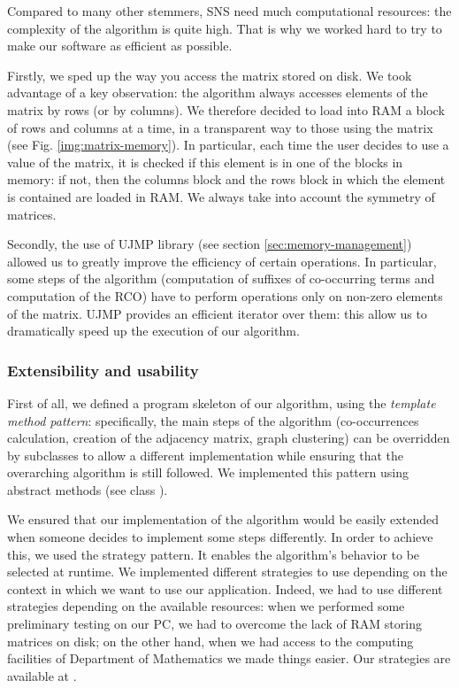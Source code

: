             Compared to many other stemmers, SNS need much computational resources: the complexity of the algorithm is quite high. That is why we worked hard to try to make our software as efficient as possible.\par
            
            Firstly, we sped up the way you access the matrix stored on disk. We took advantage of a key observation: the algorithm always accesses elements of the matrix by rows (or by columns). We therefore decided to load into RAM a block of rows and columns at a time, in a transparent way to those using the matrix (see Fig. \ref{img:matrix-memory}). In particular, each time the user decides to use a value of the matrix, it is checked if this element is in one of the blocks in memory: if not, then the columns block and the rows block in which the element is contained are loaded in RAM. We always take into account the symmetry of matrices.\par

            Secondly, the use of UJMP library (see section \ref{sec:memory-management}) allowed us to greatly improve the efficiency of certain operations. In particular, some steps of the algorithm (computation of suffixes of co-occurring terms and computation of the RCO) have to perform operations only on non-zero elements of the matrix. UJMP provides an efficient iterator over them: this allow us to dramatically speed up the execution of our algorithm.

        \subsubsection{Extensibility and usability}
            First of all, we defined a program skeleton of our algorithm, using the \emph{template method pattern}: specifically, the main steps of the algorithm (co-occurrences calculation, creation of the adjacency matrix, graph clustering) can be overridden by subclasses to allow a different implementation while ensuring that the overarching algorithm is still followed. We implemented this pattern using abstract methods (see class ).\par

            We ensured that our implementation of the algorithm would be easily extended when someone decides to implement some steps differently.
            In order to achieve this, we used the strategy pattern. It enables the algorithm's behavior to be selected at runtime. We implemented different strategies to use depending on the context in which we want to use our application. Indeed, we had to use different strategies depending on the available resources: when we performed some preliminary testing on our PC, we had to overcome the lack of RAM storing matrices on disk; on the other hand, when we had access to the computing facilities of Department of Mathematics\footnotemark{} we made things easier. Our strategies are available at .\par
            
